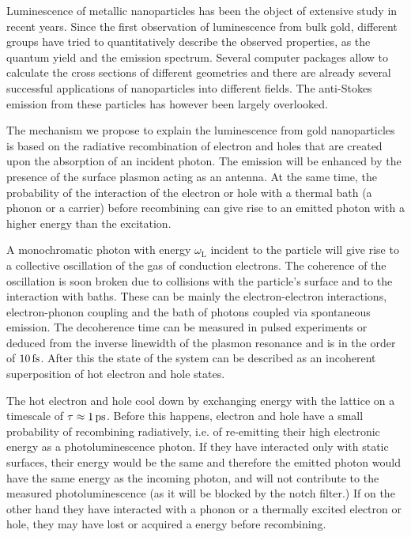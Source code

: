 Luminescence of metallic nanoparticles has been the object of extensive study in
recent years. Since the first observation of luminescence from bulk
gold\cite{Mooradian1969}, different groups have tried to quantitatively describe
the observed properties\cite{Mohamed2000,Beversluis2003a}, as the quantum
yield\cite{Fang2012,Rao2015,Yorulmaz2012,Cheng2015,Dulkeith2004} and the
emission spectrum\cite{Link2010}. Several computer
packages\cite{Yurkin2011,Draine1994,Oskooi2010} allow to calculate the cross
sections of different geometries and there are already several successful
applications of nanoparticles into different
fields\cite{Fedoruk2013,Huang2006,Huang2008,Zijlstra2009}. The anti-Stokes
emission from these particles has however been largely overlooked.

The mechanism we propose to explain the luminescence from gold nanoparticles is
based on the radiative recombination of electron and holes that are created upon
the absorption of an incident photon\cite{Dulkeith2004,Mooradian1969}. The
emission will be enhanced by the presence of the surface plasmon acting as an
antenna\cite{Mohamed2000}. At the same time, the probability of the interaction
of the electron or hole with a thermal bath (a phonon or a carrier) before
recombining can give rise to an emitted photon with a higher energy than the
excitation\cite{Hodak2000,Giri2015,Arbouet2003a}.

A monochromatic photon with energy $\omega_\textrm{L}$ incident to the particle
will give rise to a collective oscillation of the gas of conduction electrons.
The coherence of the oscillation is soon broken due to collisions with the
particle's surface and to the interaction with
baths\cite{Zhao2016,Sonnichsen2002}. These can be mainly the electron-electron
interactions, electron-phonon coupling and the bath of photons coupled via
spontaneous emission. The decoherence time can be measured in pulsed experiments
or deduced from the inverse linewidth of the plasmon resonance and is in the
order of $10\,\textrm{fs}$\cite{Sonnichsen2002}. After this the state of the system can be
described as an incoherent superposition of hot electron and hole states.

The hot electron and hole cool down by exchanging energy with the lattice on a
timescale of $\tau\approx1\,\textrm{ps}$\cite{Pustovalov2005}. Before this happens,
electron and hole have a small probability of recombining radiatively, i.e. of 
re-emitting their high electronic energy as a photoluminescence photon. If they
have interacted only with static surfaces, their energy would be the same and
therefore the emitted photon would have the same energy as the incoming
photon, and will not contribute to the measured photoluminescence (as it will be
blocked by the notch filter.) If on the other hand they have interacted with a
phonon or a thermally excited electron or hole, they may have lost or acquired a
energy before recombining.

